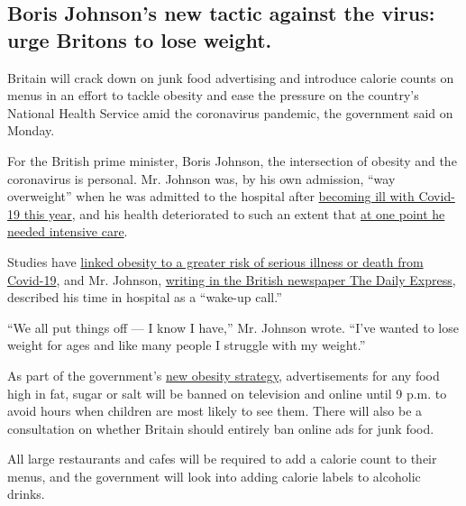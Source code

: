 \hypertarget{boris-johnsons-new-tactic-against-the-virus-urge-britons-to-lose-weight}{%
\subsection{Boris Johnson's new tactic against the virus: urge Britons
to lose
weight.}\label{boris-johnsons-new-tactic-against-the-virus-urge-britons-to-lose-weight}}

Britain will crack down on junk food advertising and introduce calorie
counts on menus in an effort to tackle obesity and ease the pressure on
the country's National Health Service amid the coronavirus pandemic, the
government said on Monday.

For the British prime minister, Boris Johnson, the intersection of
obesity and the coronavirus is personal. Mr. Johnson was, by his own
admission, ``way overweight'' when he was admitted to the hospital after
\href{https://www.nytimes3xbfgragh.onion/2020/04/05/world/europe/coronavirus-queen-elizabeth-speech.html}{becoming
ill with Covid-19 this year}, and his health deteriorated to such an
extent that
\href{https://www.nytimes3xbfgragh.onion/2020/04/09/world/europe/coronavirus-boris-johnson-britain.html}{at
one point he needed intensive care}.

Studies have
\href{https://www.nytimes3xbfgragh.onion/2020/04/16/health/coronavirus-obesity-higher-risk.html}{linked
obesity to a greater risk of serious illness or death from Covid-19},
and Mr. Johnson,
\href{https://www.express.co.uk/news/uk/1314742/Boris-Johnson-health-reforms-obesity-latest}{writing
in the British newspaper The Daily Express}, described his time in
hospital as a ``wake-up call.''

``We all put things off --- I know I have,'' Mr. Johnson wrote. ``I've
wanted to lose weight for ages and like many people I struggle with my
weight.''

As part of the government's
\href{https://www.gov.uk/government/news/new-obesity-strategy-unveiled-as-country-urged-to-lose-weight-to-beat-coronavirus-covid-19-and-protect-the-nhs}{new
obesity strategy}, advertisements for any food high in fat, sugar or
salt will be banned on television and online until 9 p.m. to avoid hours
when children are most likely to see them. There will also be a
consultation on whether Britain should entirely ban online ads for junk
food.

All large restaurants and cafes will be required to add a calorie count
to their menus, and the government will look into adding calorie labels
to alcoholic drinks.

